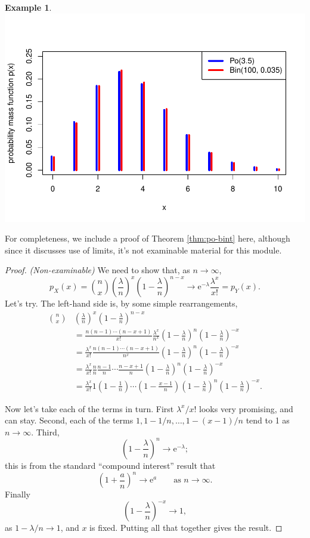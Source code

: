 \documentclass[
  a4paper,
]{book}
\theoremstyle{definition}
\theoremstyle{definition}
\newtheorem{example}{Example}[chapter]
\theoremstyle{definition}
\theoremstyle{definition}
\theoremstyle{remark}
\begin{document}
\begin{example}
\includegraphics{math1710_files/figure-latex/po-binom-pic-1.pdf}
\end{example}

For completeness, we include a proof of Theorem \ref{thm:po-bint} here, although since it discusses use of limits, it's not examinable material for this module.

\begin{proof}
\emph{(Non-examinable)}
We need to show that, as \(n \to \infty\),
\[ p_X(x) = \binom nx \left(\frac{\lambda}{n}\right)^x \left(1 - \frac{\lambda}{n}\right)^{n-x}
\to \mathrm{e}^{-\lambda} \frac{\lambda^x}{x!} = p_Y(x) . \]
Let's try. The left-hand side is, by some simple rearrangements,
\begin{align*}
\binom nx &\left(\frac{\lambda}{n}\right)^x \left(1 - \frac{\lambda}{n}\right)^{n-x} \\
  &= \frac{n(n-1)\cdots(n-x+1)}{x!} \frac{\lambda^x}{n^x} \left(1 - \frac{\lambda}{n}\right)^{n}\left(1 - \frac{\lambda}{n}\right)^{-x} \\
  &= \frac{\lambda^x}{x!} \frac{n(n-1)\cdots(n-x+1)}{n^x} \left(1 - \frac{\lambda}{n}\right)^{n}\left(1 - \frac{\lambda}{n}\right)^{-x} \\
  &= \frac{\lambda^x}{x!} \frac{n}{n} \frac{n-1}{n} \cdots \frac{n-x+1}{n} \left(1 - \frac{\lambda}{n}\right)^{n}\left(1 - \frac{\lambda}{n}\right)^{-x} \\
  &= \frac{\lambda^x}{x!} 1 \left(1 - \frac{1}{n}\right) \cdots \left(1 - \frac{x-1}{n}\right)  \left(1 - \frac{\lambda}{n}\right)^{n}\left(1 - \frac{\lambda}{n}\right)^{-x} .
\end{align*}

Now let's take each of the terms in turn. First \(\lambda^x / x!\) looks very promising, and can stay. Second, each of the terms \(1, 1 - 1/n, \dots, 1 - (x-1)/n\) tend to 1 as \(n \to \infty\). Third,
\[ \left(1 - \frac{\lambda}{n}\right)^{n} \to \mathrm{e}^{-\lambda} ; \]
this is from the standard ``compound interest'' result that
\[ \left(1 + \frac{a}{n}\right)^{n} \to \mathrm{e}^{a} \qquad \text{as $n \to \infty$}. \]
Finally
\[\left(1 - \frac{\lambda}{n}\right)^{-x} \to 1 , \]
as \(1 - \lambda/n \to 1\), and \(x\) is fixed. Putting all that together gives the result.
\end{proof}
\end{document}
